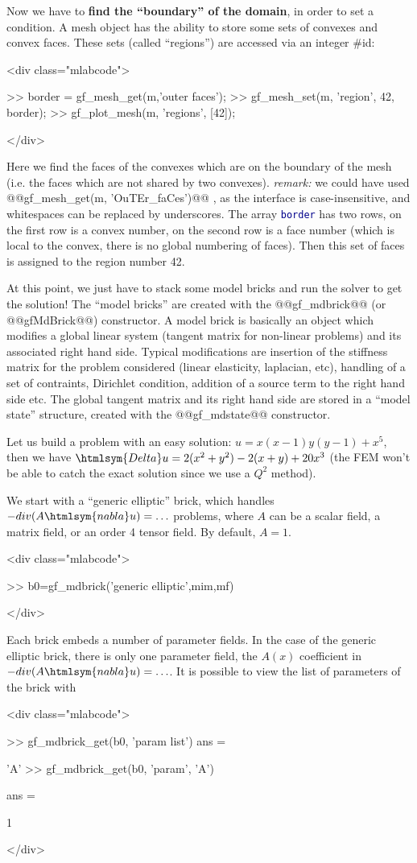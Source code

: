 \documentclass[11pt,a4paper]{article}
\newcommand{\nabla}{\htmlsym{nabla}}%
\newcommand{\Delta}{\htmlsym{Delta}}
\newcommand{\kw}[1]{\textcolor{darkblue}{\texttt{#1}}}
\newenvironment{matlab}{\begin{rawxml}<div class="mlabcode">\end{rawxml}\begin{example}}{\end{example}\begin{rawxml}</div>\end{rawxml}}
\newcommand{\kw}[1]{\textcolor{darkblue}{\texttt{#1}}}
\newenvironment{matlab}{\begin{alltt}}{\end{alltt}}
\begin{document}
Now we have to \textbf{find the ``boundary'' of the domain}, in order to set a 
condition. A mesh object has the ability to store some sets of convexes and convex faces. These sets (called ``regions'') are accessed via an integer \#id:
\begin{matlab}
>> border = gf_mesh_get(m,'outer faces');
>> gf_mesh_set(m, 'region', 42, border); %
>> gf_plot_mesh(m, 'regions', [42]); %
\end{matlab}
Here we find the faces of the convexes which are on the boundary of
the mesh (i.e. the faces which are not shared by two convexes). \textit{remark:} 
we could have used @@gf_mesh_get(m, 'OuTEr_faCes')@@ , as the
interface is case-insensitive, and whitespaces can be replaced by
underscores. The array \kw{border} has two rows, on the first row is a
convex number, on the second row is a face number (which is local to the
convex, there is no global numbering of faces). Then this set of faces
is assigned to the region number 42.

At this point, we just have to stack some model bricks and run the
solver to get the solution! The ``model bricks'' are
created with the @@gf\_mdbrick@@ (or @@gfMdBrick@@) constructor. A
model brick is basically an object which modifies a global linear
system (tangent matrix for non-linear problems) and its associated
right hand side.  Typical modifications are insertion of the stiffness
matrix for the problem considered (linear elasticity, laplacian, etc),
handling of a set of contraints, Dirichlet condition, addition of a
source term to the right hand side etc. The global tangent matrix and
its right hand side are stored in a ``model state''
structure, created with the @@gf_mdstate@@ constructor.


Let us build a problem with an easy solution: $u=x(x-1)y(y-1)+x^5$,
then we have $\Delta u=2(x^2+y^2)-2(x+y)+20x^3$ (the FEM won't be able to
catch the exact solution since we use a $Q^2$ method).


We start with a ``generic elliptic'' brick, which handles $-div(A\nabla u) = \ldots $ problems, where $A$ can be a scalar field, a matrix field, or an order 4 tensor field. By default, $A=1$.
\begin{matlab}
>> b0=gf_mdbrick('generic elliptic',mim,mf)
\end{matlab}

Each brick embeds a number of parameter fields. In the case of the generic elliptic brick, there is only one parameter field, the $A(x)$ coefficient in $-div(A\nabla u)= \ldots$. It is possible to view the list of parameters of the brick with
\begin{matlab}
>> gf_mdbrick_get(b0, 'param list')
ans =

    'A'
>> gf_mdbrick_get(b0, 'param', 'A')

ans =

     1
\end{matlab}
\end{document}
